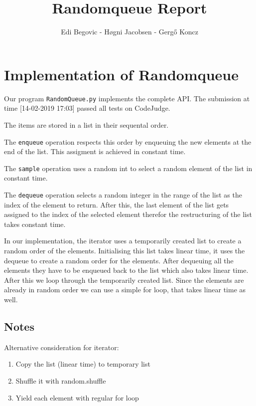 \documentclass{tufte-handout}
\title{Randomqueue Report}
\author{Edi Begovic - Høgni Jacobsen - Gergő Koncz}
\begin{document}
\maketitle
\thispagestyle{empty}

\section{Implementation of Randomqueue}


Our program \texttt{RandomQueue.py} implements the complete API.
The submission at time [14-02-2019 17:03] passed all tests on CodeJudge.

The items are stored in a list in their sequental order.

The \texttt{enqueue} operation respects this order by enqueuing the new elements at the end of the list. 
This assigment is achieved in constant time.

The \texttt{sample} operation uses a random int to select a random element of the list in constant time. 

The \texttt{dequeue} operation selects a random integer in the range of the list as the index of the element to return. After this, the last element of the list gets assigned to the index of the selected element therefor the restructuring of the list  takes constant time.

In our implementation, the iterator uses a temporarily created list to create a random order of the elements. 
Initialising this list takes linear time, it uses the dequeue to create a random order for the elements. After dequeuing all the elements they have to be enqueued back to the list which also takes linear time. 
After this we loop through the temporarily created list. Since the elements are already in random order we can use a simple for loop, that takes linear time as well.


\subsection{Notes}

Alternative consideration for iterator:
\begin{enumerate}
\item Copy the list (linear time) to temporary list
\item Shuffle it with random.shuffle
\item Yield each element with regular for loop
\end{enumerate}
\end{document}
